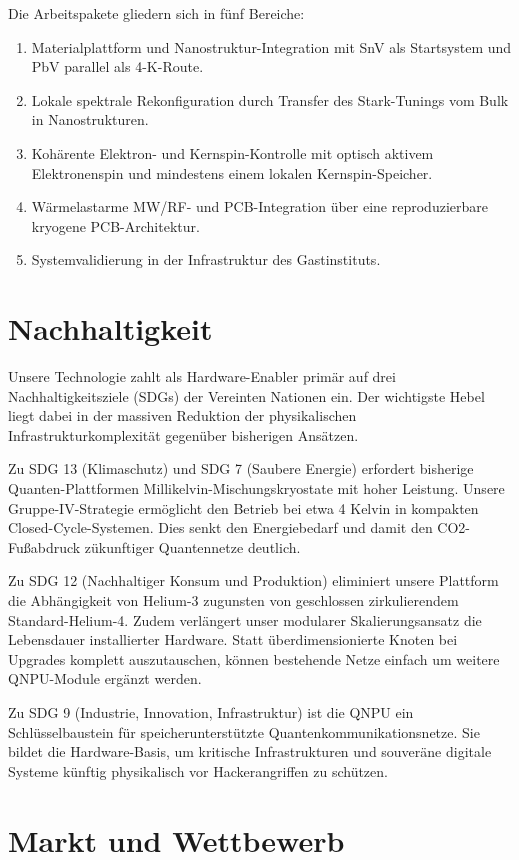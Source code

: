 \documentclass[11pt,oneside]{scrartcl}
\begin{document}
Die Arbeitspakete gliedern sich in f\"unf Bereiche:
\begin{enumerate}
  \item Materialplattform und Nanostruktur-Integration mit SnV als Startsystem und PbV parallel als 4-K-Route.
  \item Lokale spektrale Rekonfiguration durch Transfer des Stark-Tunings vom Bulk in Nanostrukturen.
  \item Koh\"arente Elektron- und Kernspin-Kontrolle mit optisch aktivem Elektronenspin und mindestens einem lokalen Kernspin-Speicher.
  \item W\"armelastarme MW/RF- und PCB-Integration \"uber eine reproduzierbare kryogene PCB-Architektur.
  \item Systemvalidierung in der Infrastruktur des Gastinstituts.
\end{enumerate}

\section{Nachhaltigkeit}
Unsere Technologie zahlt als Hardware-Enabler prim\"ar auf drei Nachhaltigkeitsziele (SDGs) der Vereinten Nationen ein. Der wichtigste Hebel liegt dabei in der massiven Reduktion der physikalischen Infrastrukturkomplexit\"at gegen\"uber bisherigen Ans\"atzen.

Zu SDG 13 (Klimaschutz) und SDG 7 (Saubere Energie) erfordert bisherige Quanten-Plattformen Millikelvin-Mischungskryostate mit hoher Leistung. Unsere Gruppe-IV-Strategie erm\"oglicht den Betrieb bei etwa 4 Kelvin in kompakten Closed-Cycle-Systemen. Dies senkt den Energiebedarf und damit den CO2-Fu\ss abdruck z\"ukunftiger Quantennetze deutlich.

Zu SDG 12 (Nachhaltiger Konsum und Produktion) eliminiert unsere Plattform die Abh\"angigkeit von Helium-3 zugunsten von geschlossen zirkulierendem Standard-Helium-4. Zudem verl\"angert unser modularer Skalierungsansatz die Lebensdauer installierter Hardware. Statt \"uberdimensionierte Knoten bei Upgrades komplett auszutauschen, k\"onnen bestehende Netze einfach um weitere QNPU-Module erg\"anzt werden.

Zu SDG 9 (Industrie, Innovation, Infrastruktur) ist die QNPU ein Schl\"usselbaustein f\"ur speicherunterst\"utzte Quantenkommunikationsnetze. Sie bildet die Hardware-Basis, um kritische Infrastrukturen und souver\"ane digitale Systeme künftig physikalisch vor Hackerangriffen zu sch\"utzen.

\section{Markt und Wettbewerb}
\end{document}
